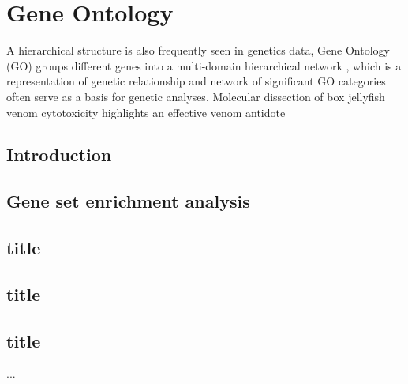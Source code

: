 \chapter{Gene Ontology}\label{chap:Jellyfish}

A hierarchical structure is also frequently seen in genetics data, Gene Ontology (GO) groups different genes into a multi-domain hierarchical network \citep{GO2007}, which is a representation of genetic relationship and network of significant GO categories often serve as a basis for genetic analyses.
Molecular dissection of box jellyfish venom cytotoxicity highlights an effective venom antidote
\section{Introduction}

\section{Gene set enrichment analysis}
\section{title}
\section{title}
\section{title}

\citet{lau2019molecular}

\begin{landscape}
	...
\end{landscape}

